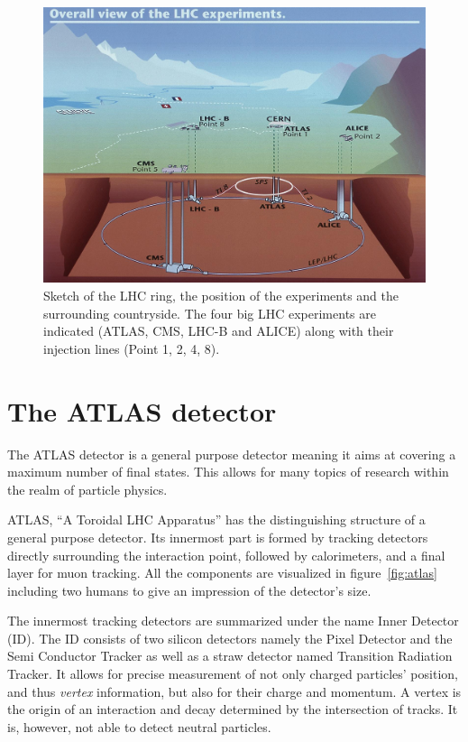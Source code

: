 \begin{figure}[htbp]
  \centering
  \includegraphics[scale=0.4]{figures_LHC/CERN-all-experiments.jpg}
  \caption[Sketch of the LHC ring.]{Sketch of the LHC ring, the position
    of the experiments and the surrounding countryside. The four big
    LHC experiments are indicated (ATLAS, CMS, LHC-B and ALICE) along with their injection lines (Point 1, 2, 4, 8).~\cite{Jean-Luc:841555}}
  \label{fig:LHC}
\end{figure}


\section{The ATLAS detector}

The ATLAS detector is a general purpose detector meaning it aims at covering a maximum number of final states. This allows for many topics of research within the realm of particle physics.

ATLAS, \enquote{A Toroidal LHC Apparatus} has the distinguishing structure of a general purpose detector. Its innermost part is formed by tracking detectors directly surrounding the interaction point, followed by calorimeters, and a final layer for muon tracking. All the components are visualized in figure~\ref{fig:atlas} including two humans to give an impression of the detector's size.

The innermost tracking detectors are summarized under the name Inner Detector (ID). The ID consists of two silicon detectors namely the Pixel Detector and the Semi Conductor Tracker as well as a straw detector named Transition Radiation Tracker. It allows for precise measurement of not only charged particles' position, and thus \emph{vertex} information, but also for their charge and momentum. A vertex is the origin of an interaction and decay determined by the intersection of tracks.  It is, however, not able to detect neutral particles.

